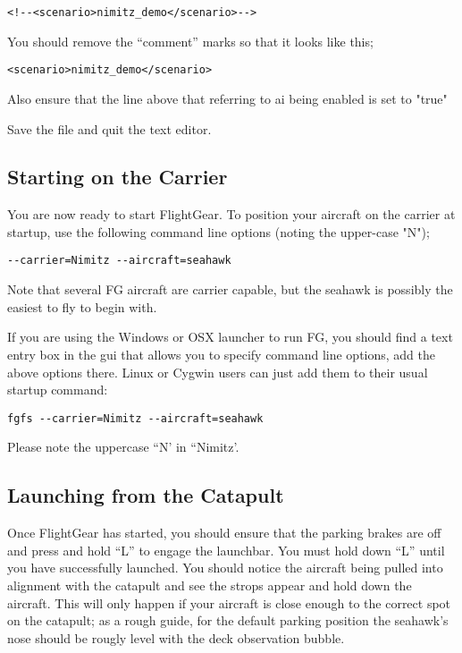 \begin{verbatim}
<!--<scenario>nimitz_demo</scenario>--> 
\end{verbatim}

You should remove the ``comment'' marks so that it looks like this;


\begin{verbatim}
<scenario>nimitz_demo</scenario> 
\end{verbatim}

Also ensure that the line above that referring to ai being enabled is set to "true"

Save the file and quit the text editor.

\subsection{Starting on the Carrier}

You are now ready to start FlightGear. To position your aircraft on the carrier at startup, 
use the following command line options (noting the upper-case "N");

\begin{verbatim}
--carrier=Nimitz --aircraft=seahawk 
\end{verbatim}

Note that several FG aircraft are carrier capable, but the seahawk is possibly the easiest to fly to begin with.

If you are using the Windows or OSX launcher to run FG, you should find a text entry box in the gui that 
allows you to specify command line options, add the above options there. Linux or Cygwin users can just 
add them to their usual startup command: 

\begin{verbatim}
fgfs --carrier=Nimitz --aircraft=seahawk
\end{verbatim}

Please note the uppercase ``N' in ``Nimitz'.

\subsection{Launching from the Catapult}

Once FlightGear has started, you should ensure that the parking brakes are off and press and hold ``L'' to 
engage the launchbar. You must hold down ``L'' until you have successfully launched. 
You should notice the aircraft being pulled into alignment with the catapult and see 
the strops appear and hold down the aircraft.  This will only happen if your aircraft is 
close enough to the correct spot on the catapult; as a rough guide, for the default 
parking position the seahawk's nose should be rougly level with the deck observation bubble.

